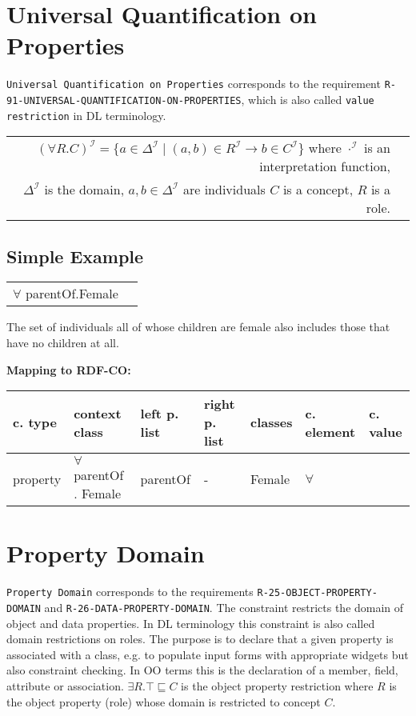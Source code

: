 \documentclass{llncs}
\newcommand{\ms}[1]{\texttt{#1}}
\newenvironment{gcotable}{
  \scriptsize
  \sffamily
  \vspace{0cm}
	\begin{center}
	\textbf{\vspace{0.4cm}Mapping to RDF-CO:} \\
  \begin{tabular}{l|l|l|l|l|l|l}
	\hline
  \textbf{c. type} & \textbf{context class} & \textbf{left p. list} & \textbf{right p. list} & \textbf{classes} & \textbf{c. element} & \textbf{c. value} \\
  \hline

}{
  \hline
  \end{tabular}
	\end{center}
}
\newenvironment{DL}{
  \vspace{0cm}
	\begin{center}
  \begin{tabular}{r l}

}{
  \end{tabular}
	\end{center}
}
\begin{document}
\section{Universal Quantification on Properties}

\ms{Universal Quantification on Properties} corresponds to the requirement \ms{R-91-UNIVERSAL-QUANTIFICATION-ON-PROPERTIES}, 
which is also called \ms{value} \ms{restriction} in DL terminology.

\begin{center}
\begin{DL} 
$(\forall R.C)^\mathcal{I}= \{a \in \Delta^\mathcal{I}\mid (a,b) \in R^\mathcal{I} \rightarrow b \in C^\mathcal{I} \}$ where $\cdot^\mathcal{I}$ is an interpretation function, \\
$\Delta^\mathcal{I}$ is the domain, $a,b \in \Delta^\mathcal{I}$ are individuals $C$ is a concept, $R$ is a role. 
\end{DL}
\end{center}

\subsection{Simple Example}

\begin{DL}
$\forall$ parentOf.Female
\end{DL}

The set of individuals all of whose children are female also includes those that have no children at all.

\begin{gcotable}
property & $\forall$ parentOf . Female & parentOf & - & Female & $\forall$ \\
\end{gcotable}

\section{Property Domain}

\ms{Property Domain} corresponds to the requirements \ms{R-25-OBJECT-PROPERTY-DOMAIN} and \ms{R-26-DATA-PROPERTY-DOMAIN}.
The constraint restricts the domain of object and data properties.
In DL terminology this constraint is also called domain restrictions on roles.
The purpose is to declare that a given property is associated with a class, e.g. to populate input forms with appropriate widgets but also constraint checking. In OO terms this is the declaration of a member, field, attribute or association. 
$\exists R. \top \sqsubseteq C$ is the object property restriction where $R$ is the object property (role) whose domain is restricted to concept $C$.
\end{document}
